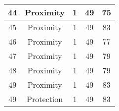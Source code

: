 \documentclass[results.tex]{subfiles}
\begin{document}
\begin{center}
\begin{tabular}{| c || c | c | c | c |}
            \hline
            44                      & Proximity                    & 1                      & 49                      & 75                   \\
            \hline
            45                      & Proximity                    & 1                      & 49                      & 83                   \\
            \hline
            46                      & Proximity                    & 1                      & 49                      & 77                   \\
            \hline
            47                      & Proximity                    & 1                      & 49                      & 79                   \\
            \hline
            48                      & Proximity                    & 1                      & 49                      & 79                   \\
            \hline
            49                      & Proximity                    & 1                      & 49                      & 83                   \\
            \hline
            49                      & Protection                   & 1                      & 49                      & 83                   \\
            \hline
        \end{tabular}
    \end{center}
\end{document}
